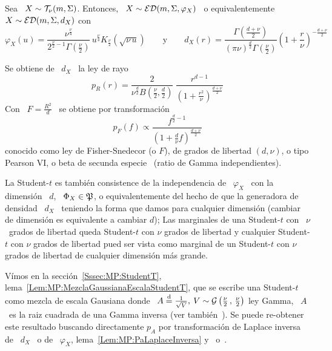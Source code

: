 \begin{ejemplo}
%
  Sea \ $X \sim \mathcal{T}_\nu(m,\Sigma)$.  Entonces, \ $X \sim \mathcal{ED}(m,\Sigma,\varphi_X)$
  \ o equivalentemente \ $X \sim \mathcal{ED}(m,\Sigma,d_X)$ con
  \[
  \varphi_X(u)   =  \frac{\nu^{\frac{\nu}{4}}}{2^{\frac{\nu}{2}-1}  \Gamma\left(
      \frac{\nu}{2}   \right)}   \,  u^{\frac{\nu}{4}}   K_{\frac{\nu}{2}}\left(
    \sqrt{\nu \,  u} \right) \qquad \mbox{y} \qquad  d_X(r) = \frac{\Gamma\left(
      \frac{d+\nu}{2}     \right)}{(\pi     \nu)^{\frac{d}{2}}     \Gamma\left(
      \frac{\nu}{2}    \right)}   \left(    1    +   \frac{r}{\nu}    \right)^{-
    \frac{d+\nu}{2}}
  \]

  Se obtiene de \ $d_X$ \ la ley de rayo
  \[
  p_R(r)  =  \frac{2}{\nu^{\frac{d}{2}}   B\left(  \frac{\nu}{2}  ,  \frac{d}{2}
    \right)} \:
  \frac{r^{d-1}}{\left( 1 + \frac{r^2}{\nu} \right)^{\frac{d+\nu}{2}}}
  \]
  Con \ $F = \frac{R^2}{d}$ \ se obtiene por transformaci\'on
  \[
  p_F(f)   \propto   \frac{f^{\frac{d}{2}-1}}{\left(   1   +   \frac{d}{\nu}   f
    \right)^{\frac{d+\nu}{2}}}
  \]
  conocido como ley de Fisher-Snedecor (o $F$), de grados de libertad $(d,\nu)$,
  o tipo Pearson VI, o  beta de secunda especie~\cite{JohKot95:v2, Muk00, Bre88,
    IbaPer12} (ratio de Gamma independientes).

  La Student-$t$ es tambi\'en consistence de la independencia de \ $\varphi_X$ \
  con la dimensi\'on \ $d$, \  $\Phi_X \in \mathfrak{P}$, o equivalentemente del hecho de
  que  la generadora de  densidad \  $d_X$ \  teniendo la  forma que  damos para
  cualquier dimensi\'on  (cambiar de dimensi\'on es equivalente  a cambiar $d$);
  Las  marginales de  una Student-$t$  con \  $\nu$ \  grados de  libertad queda
  Student-$t$ con  $\nu$ grados  de libertad y  cualquier Student-$t$  con $\nu$
  grados de  libertad pued ser vista  como marginal de un  Student-$t$ con $\nu$
  grados de libertad de cualquier dimensi\'on m\'as grande.

  V\'imos           en           la           secci\'on~\ref{Sssec:MP:StudentT},
  lema~\ref{Lem:MP:MezclaGaussianaEscalaStudentT},    que    se   escribe    una
  Student-$t$   como   mezcla   de   escala   Gausiana   donde   \   $A   \stackrel{\mathrm{d}}{=}
  \frac{1}{\sqrt{V}},  \: V \sim  \mathcal{G}\left( \frac{\nu}{2}  \, ,  \, \frac{\nu}{2}
  \right)$ ley Gamma, \ie \ $A$ \  es la raiz cuadrada de una Gamma inversa (ver
  tambi\'en~\cite{FanKot90,  KotNad04}).   Se  puede re-obtener  este  resultado
  buscando directamente $p_A$ por transformaci\'on de Laplace inversa de \ $d_X$
  \  o  de  \  $\varphi_X$,  lema~\ref{Lem:MP:PaLaplaceInversa}  y~\cite[Cap.~5,
  Tab.~A.5.1, Ec.~14]{Pou10} o~\cite[Cap.~2, Tab.~2.3, Ec.~14]{Pou99}.
%
\end{ejemplo}

